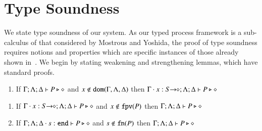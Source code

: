 \section{Type Soundness}
\label{app:ts}

We state type soundness of our system.
As our typed process framework is a sub-calculus of that considered
by Mostrous and Yoshida, the proof of type soundness requires notions
and properties which are specific instances of those already shown in~\cite{MostrousY15}.
We begin by stating weakening and strengthening lemmas,
which have standard proofs.

\begin{lemma}\rm
	\label{l:weak}
	\begin{enumerate}[$-$]
		\item	If $\Gamma; \Lambda; \Delta \vdash P \triangleright \diamond$
			and
			$x \not\in \mathtt{dom}(\Gamma,\Lambda,\Delta)$
			then
			$\Gamma\cdot x: S\!\! \rightarrow\!\! \diamond; \Lambda; \Delta \vdash P \triangleright \diamond$ 
	\end{enumerate}
\end{lemma}

\begin{lemma}\rm
	\label{l:stren}
	\begin{enumerate}[$-$]
		\item	If $\Gamma \cdot x: S\!\! \rightarrow\!\! \diamond; \Lambda; \Delta \vdash P \triangleright \diamond$
			and
			$x \not\in \mathtt{fpv}(P)$ then
			$\Gamma; \Lambda; \Delta \vdash P \triangleright \diamond$

		\item	If $\Gamma; \Lambda; \Delta \cdot s: \mathtt{end} \vdash P \triangleright \diamond$
			and
			$s \not\in \mathtt{fn}(P)$
			then
			$\Gamma; \Lambda; \Delta \vdash P \triangleright \diamond$
	\end{enumerate}
\end{lemma}

